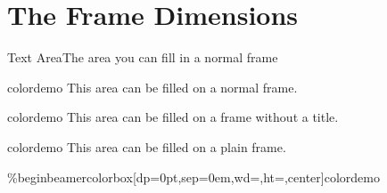 \documentclass[final]{beamer}
\begin{document}
\section{The Frame Dimensions}
%
%
%
%
\begin{frame}[t]{Text Area}{The area you can fill in a normal frame}

  \begin{beamercolorbox}[dp=0pt,sep=0em,wd=\textwidth,ht=\FrameHeight,center]{colordemo}%
    This area can be filled on a normal frame.
    \vspace{5cm}%
  \end{beamercolorbox}%
\end{frame}
%
%
%
\begin{frame}

  \begin{beamercolorbox}[dp=0pt,sep=0em,
      wd=\textwidth,
    ht=\dimexpr\FrameHeight+\TitleHeight+4mm,center]{colordemo}%
    This area can be filled on a frame without a title.
    \vspace{5cm}%
  \end{beamercolorbox}%
\end{frame}
%
%
%
%
%
\begin{frame}[plain]
  \begin{beamercolorbox}[dp=0pt,sep=0em,wd=\textwidth,ht=\paperheight,center]{colordemo}%
    This area can be filled on a plain frame.
    \vspace{5cm}%
  \end{beamercolorbox}%
\end{frame}
%
%
%
%
%
\%begin{beamercolorbox}[dp=0pt,sep=0em,wd=\textwidth,ht=\paperheight,center]{colordemo}%
%
%
%
%
%
\end{document}
